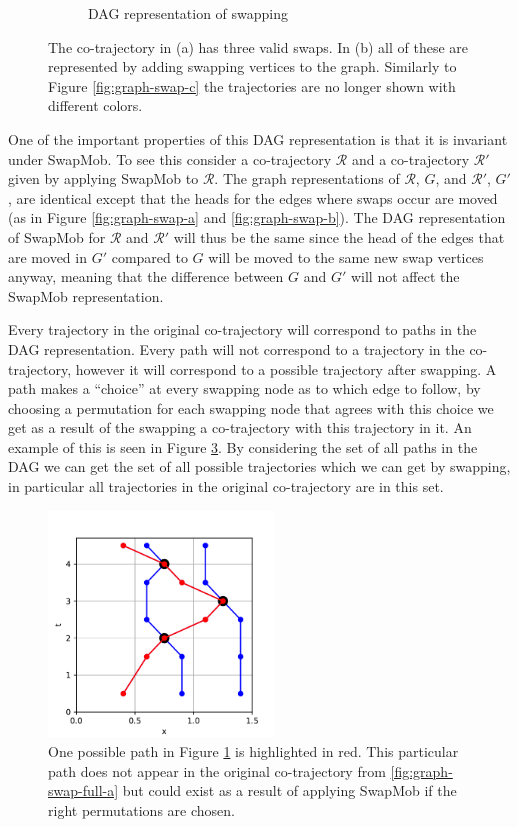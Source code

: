 \documentclass[12pt]{article}
\newcommand{\cotraj}{\mathcal{R}}
\theoremstyle{definition}
\begin{document}
\begin{figure}
\begin{subfigure}[t]{0.45\textwidth}
      \caption{DAG representation of swapping}
      \label{fig:graph-swap-full-b}
    \end{subfigure}
    \caption{The co-trajectory in (a) has three valid swaps. In (b)
      all of these are represented by adding swapping vertices to the
      graph. Similarly to Figure \ref{fig:graph-swap-c} the
      trajectories are no longer shown with different colors.}
    \label{fig:graph-swap-full}
\end{figure}

One of the important properties of this DAG representation is that it
is invariant under SwapMob. To see this consider a co-trajectory
\(\cotraj\) and a co-trajectory \(\cotraj'\) given by applying SwapMob
to \(\cotraj\). The graph representations of \(\cotraj\), \(G\), and
\(\cotraj'\), \(G'\), are identical except that the heads for the
edges where swaps occur are moved (as in Figure \ref{fig:graph-swap-a}
and \ref{fig:graph-swap-b}). The DAG representation of SwapMob for
\(\cotraj\) and \(\cotraj'\) will thus be the same since the head of
the edges that are moved in \(G'\) compared to \(G\) will be moved to
the same new swap vertices anyway, meaning that the difference between
\(G\) and \(G'\) will not affect the SwapMob representation.

Every trajectory in the original co-trajectory will correspond to
paths in the DAG representation. Every path will not correspond to a
trajectory in the co-trajectory, however it will correspond to a
possible trajectory after swapping. A path makes a ``choice'' at every
swapping node as to which edge to follow, by choosing a permutation
for each swapping node that agrees with this choice we get as a result
of the swapping a co-trajectory with this trajectory in it. An example
of this is seen in Figure \ref{fig:graph-path}. By considering the set
of all paths in the DAG we can get the set of all possible
trajectories which we can get by swapping, in particular all
trajectories in the original co-trajectory are in this set.

\begin{figure}
  \centering
  \includegraphics[width=6cm]{graph-swap-full-path.pdf}
  \caption{One possible path in Figure \ref{fig:graph-swap-full-b} is
    highlighted in red. This particular path does not appear in the
    original co-trajectory from \ref{fig:graph-swap-full-a} but could
    exist as a result of applying SwapMob if the right permutations
    are chosen.}
  \label{fig:graph-path}
\end{figure}
\end{document}
